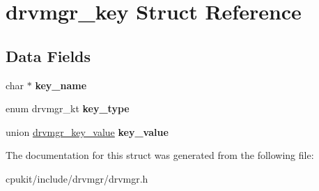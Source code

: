 \hypertarget{structdrvmgr__key}{}\section{drvmgr\+\_\+key Struct Reference}
\label{structdrvmgr__key}
\subsection*{Data Fields}
\begin{DoxyCompactItemize}
\item 
\mbox{\label{structdrvmgr__key_afaada71d5d8955b0057ebdaeb98644e6}} 
char $\ast$ {\bfseries key\+\_\+name}
\item 
\mbox{\label{structdrvmgr__key_ac7489c1fdfad1a30727c8d90c172dc3d}} 
enum drvmgr\+\_\+kt {\bfseries key\+\_\+type}
\item 
\mbox{\label{structdrvmgr__key_aa8b8387ffabf53db380deb0d9315e2b9}} 
union \mbox{\hyperlink{uniondrvmgr__key__value}{drvmgr\+\_\+key\+\_\+value}} {\bfseries key\+\_\+value}
\end{DoxyCompactItemize}


The documentation for this struct was generated from the following file\+:\begin{DoxyCompactItemize}
\item 
cpukit/include/drvmgr/drvmgr.\+h\end{DoxyCompactItemize}

